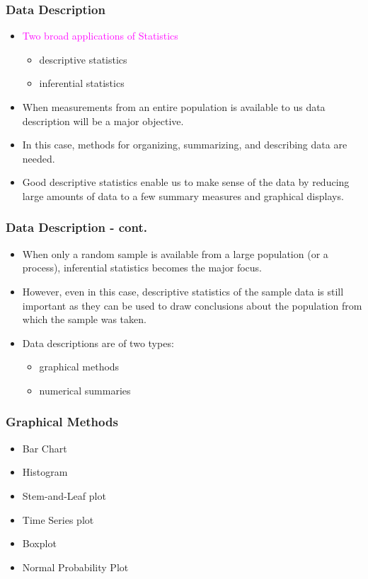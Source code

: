 \documentclass[xcolor=dvipsnames,12pt]{beamer}
\begin{document}
\begin{frame}
\frametitle{Data Description}
\begin{itemize}
\item  \textcolor{magenta}{Two broad applications of Statistics}\\[.1in]
\begin{itemize}
\item descriptive statistics
\item inferential statistics
\end{itemize}
\item When measurements from an entire population is available to us
data description will be a major objective. 
\item In this case, methods for organizing, summarizing, and describing
data are needed. 
\item  Good descriptive statistics enable us to make sense
of the data by reducing large amounts of data to a few summary
measures and graphical displays.
\end{itemize}
\end{frame}

\begin{frame}
\frametitle{Data Description - cont.}
\begin{itemize}
\item When only a random sample is available from a large population
(or a process),  inferential statistics becomes the major focus.
\item However, even in this case, descriptive statistics of the sample 
data is still important as they can be used to draw conclusions 
about the population from which the sample was taken.
\item  Data descriptions are of two types:\\[.2in]
\begin{itemize} 
\item graphical methods
\item  numerical summaries
\end{itemize}
\end{itemize}
\end{frame}


\begin{frame}
\frametitle{Graphical Methods}
\begin{itemize}
\item Bar Chart 
\item Histogram 
\item Stem-and-Leaf plot 
\item Time Series plot 
\item Boxplot 
\item Normal Probability Plot
\end{itemize}
\end{frame}
\end{document}
